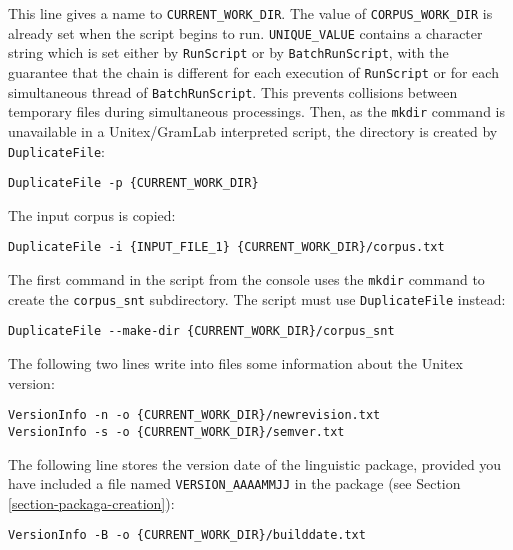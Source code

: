 \noindent This line gives a name to \verb$CURRENT_WORK_DIR$. The value of
\verb$CORPUS_WORK_DIR$ is already set when the script begins to run.
\verb$UNIQUE_VALUE$ contains a character string which is set either by \verb$RunScript$ or by
\verb$BatchRunScript$, with the guarantee that the chain is different for each execution of
\verb$RunScript$ or for each simultaneous thread of \verb$BatchRunScript$. This
prevents collisions between temporary files during simultaneous processings. Then,
as the \verb$mkdir$ command is unavailable in a Unitex/GramLab interpreted script, the
directory is created by \verb$DuplicateFile$:

\begin{Verbatim}[fontsize=\small,fontfamily=helvetica]
DuplicateFile -p {CURRENT_WORK_DIR}
\end{Verbatim}

\noindent The input corpus is copied:

\begin{Verbatim}[fontsize=\small,fontfamily=helvetica]
DuplicateFile -i {INPUT_FILE_1} {CURRENT_WORK_DIR}/corpus.txt
\end{Verbatim}

\noindent The first command in the script from the console uses the
\verb$mkdir$ command to create the \verb$corpus_snt$ subdirectory. The script must use
\verb$DuplicateFile$ instead:

\begin{Verbatim}[fontsize=\small,fontfamily=helvetica]
DuplicateFile --make-dir {CURRENT_WORK_DIR}/corpus_snt
\end{Verbatim}

\noindent The following two lines write into files some information about the Unitex version:

\begin{Verbatim}[fontsize=\small,fontfamily=helvetica]
VersionInfo -n -o {CURRENT_WORK_DIR}/newrevision.txt
VersionInfo -s -o {CURRENT_WORK_DIR}/semver.txt
\end{Verbatim}

\noindent The following line stores the version date of the linguistic package,
provided you have included a file named \verb$VERSION_AAAAMMJJ$ in the package
(see Section \ref{section-packaga-creation}):

\begin{Verbatim}[fontsize=\small,fontfamily=helvetica]
VersionInfo -B -o {CURRENT_WORK_DIR}/builddate.txt
\end{Verbatim}

